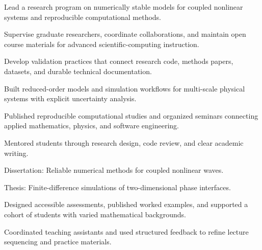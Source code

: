\documentclass[fontsize=11pt, margin=normal, medium=print]{careerdossier-cv}
\begin{document}
\MakeCDossierHeader
{}
\begin{CDossierEntry}[title = {Associate Professor of Computational Mathematics}, organization = {Example University}, location = {Toronto, ON}, dates = {2024--Present}]
  \begin{CDossierItemize}
    \item Lead a research program on numerically stable models for coupled nonlinear systems and reproducible computational methods.
    \item Supervise graduate researchers, coordinate collaborations, and maintain open course materials for advanced scientific-computing instruction.
    \item Develop validation practices that connect research code, methods papers, datasets, and durable technical documentation.
  \end{CDossierItemize}
\end{CDossierEntry}
\begin{CDossierEntry}[title = {Postdoctoral Fellow}, organization = {Institute for Applied Analysis}, location = {Waterloo, ON}, dates = {2021--2024}]
  \begin{CDossierItemize}
    \item Built reduced-order models and simulation workflows for multi-scale physical systems with explicit uncertainty analysis.
    \item Published reproducible computational studies and organized seminars connecting applied mathematics, physics, and software engineering.
    \item Mentored students through research design, code review, and clear academic writing.
  \end{CDossierItemize}
\end{CDossierEntry}
\begin{CDossierEntry}[title = {Ph.D. in Computational Science}, organization = {Example University}, location = {Toronto, ON}, dates = {2016--2021}]
  Dissertation: Reliable numerical methods for coupled nonlinear waves.
\end{CDossierEntry}
\begin{CDossierEntry}[title = {M.Sc. in Applied Mathematics}, organization = {Example University}, location = {Ottawa, ON}, dates = {2014--2016}]
  Thesis: Finite-difference simulations of two-dimensional phase interfaces.
\end{CDossierEntry}
\begin{CDossierEntry}[title = {Sessional Instructor}, organization = {MATH 2410: Differential Equations}, location = {Example University}, dates = {Winter 2025}]
  \begin{CDossierItemize}
    \item Designed accessible assessments, published worked examples, and supported a cohort of students with varied mathematical backgrounds.
    \item Coordinated teaching assistants and used structured feedback to refine lecture sequencing and practice materials.
  \end{CDossierItemize}
\end{CDossierEntry}
\end{document}
